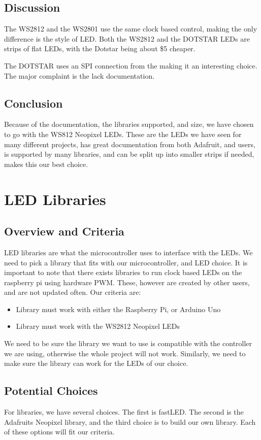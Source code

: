 \documentclass[onecolumn, draftclsnofoot,10pt, compsoc]{IEEEtran}
\begin{document}
		\subsection{Discussion}
		The WS2812 and the WS2801 use the same clock based control, making the only
		difference is the style of LED. Both the WS2812 and the DOTSTAR LEDs are
		strips of flat LEDs, with the Dotstar being about \$5 cheaper.

		\vspace{5mm}
		\noindent The DOTSTAR uses an SPI connection from the making it an interesting choice.
		The major complaint is the lack documentation.
		\subsection{Conclusion}
		\noindent Because of the documentation, the libraries supported, and size,
		we have chosen to go with the WS812 Neopixel LEDs. These are the LEDs we
		have seen for many different projects, has great documentation from both
		Adafruit, and users, is supported by many libraries, and can be split up
		into smaller strips if needed, makes this our best choice.


	\section{LED Libraries}
		\subsection{Overview and Criteria}
		\noindent LED libraries are what the microcontroller uses to interface with
		the LEDs. We need to pick a library that fits with our microcontroller, and
		LED choice. It is important to note that there exists libraries to run
		clock based LEDs on the raspberry pi using hardware PWM. These, however
		are created by other users, and are not updated often. Our
		criteria are:
		\begin{itemize}
			\item Library must work with either the Raspberry Pi, or Arduino Uno
			\item Library must work with the WS2812 Neopixel LEDs
		\end{itemize}
		\noindent We need to be sure the library we want to use is compatible with
		the controller we are using, otherwise the whole project will not work.
		Similarly, we need to make sure the library can work for the LEDs of our
		choice.
		\subsection{Potential Choices}
		\noindent For libraries, we have several choices. The first is fastLED. The
		second is the Adafruits Neopixel library, and the third choice is to build
		our own library. Each of these options will fit our criteria.
\end{document}
